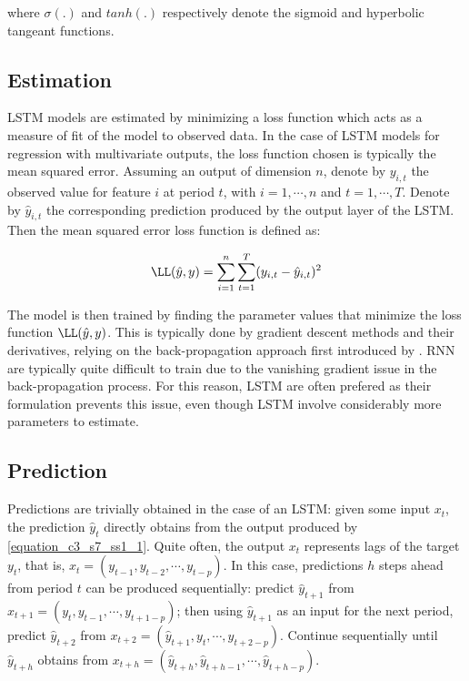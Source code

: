 where $\sigma(.)$ and $tanh(.)$ respectively denote the sigmoid and hyperbolic tangeant functions.

\newpage

\subsection{Estimation}
\label{chapter3_section7_subsection2}


LSTM models are estimated by minimizing a loss function which acts as a measure of fit of the model to observed data. In the case of LSTM models for regression with multivariate outputs, the loss function chosen is typically the mean squared error. Assuming an output of dimension $n$, denote by $y_{i,t}$ the observed value for feature $i$ at period $t$, with $i=1, \cdots,n$ and $t=1, \cdots, T$. Denote by $\hat{y}_{i,t}$ the corresponding prediction produced by the output layer of the LSTM. Then the mean squared error loss function is defined as:

\begin{equation}
\LL(\hat{y}, y) = \sum_{i=1}^{n} \sum_{t=1}^{T} (y_{i,t} - \hat{y}_{i,t})^2
\label{equation_c3_s7_ss2_1}
\end{equation}

The model is then trained by finding the parameter values that minimize the loss function $\LL(\hat{y}, y)$. This is typically done by gradient descent methods and their derivatives, relying on the back-propagation approach first introduced by \cite{Rumelhart1986}. RNN are typically quite difficult to train due to the vanishing gradient issue in the back-propagation process. For this reason, LSTM are often prefered as their formulation prevents this issue, even though LSTM involve considerably more parameters to estimate.


\subsection{Prediction}
\label{chapter3_section7_subsection3}

Predictions are trivially obtained in the case of an LSTM: given some input $x_t$, the prediction $\hat{y}_t$ directly obtains from the output produced by \ref{equation_c3_s7_ss1_1}. Quite often, the output $x_t$ represents lags of the target $y_t$, that is, $x_t = (y_{t-1}, y_{t-2}, \cdots, y_{t-p})$. In this case, predictions $h$ steps ahead from period $t$ can be produced sequentially: predict $\hat{y}_{t+1}$ from $x_{t+1} = (y_{t}, y_{t-1}, \cdots, y_{t+1-p})$; then using $\hat{y}_{t+1}$ as an input for the next period, predict $\hat{y}_{t+2}$ from $x_{t+2} = (\hat{y}_{t+1}, y_{t}, \cdots, y_{t+2-p})$. Continue sequentially until $\hat{y}_{t+h}$ obtains from $x_{t+h} = (\hat{y}_{t+h}, \hat{y}_{t+h-1}, \cdots, \hat{y}_{t+h-p})$.

\newpage









